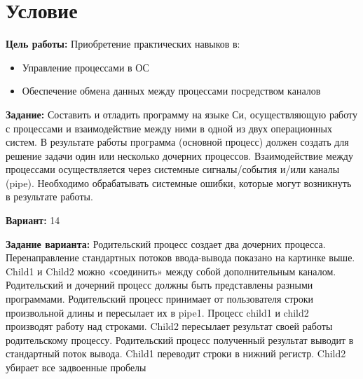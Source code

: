 \section{Условие}
{\bfseries Цель работы:} 
Приобретение практических навыков в:
\begin{itemize}
  \item Управление процессами в ОС
  \item Обеспечение обмена данных между процессами посредством каналов
\end{itemize}

{\bfseries Задание:} Составить и отладить программу на языке Си, осуществляющую работу с процессами и
взаимодействие между ними в одной из двух операционных систем. В результате работы
программа (основной процесс) должен создать для решение задачи один или несколько
дочерних процессов. Взаимодействие между процессами осуществляется через системные
сигналы/события и/или каналы (pipe).
Необходимо обрабатывать системные ошибки, которые могут возникнуть в результате работы.

{\bfseries Вариант:} 14

{\bfseries Задание варианта:}
Родительский процесс создает два дочерних процесса. Перенаправление стандартных потоков
ввода-вывода показано на картинке выше. Child1 и Child2 можно «соединить» между собой
дополнительным каналом. Родительский и дочерний процесс должны быть представлены
разными программами.
Родительский процесс принимает от пользователя строки произвольной длины и пересылает их в
pipe1. Процесс child1 и child2 производят работу над строками. Child2 пересылает результат своей
работы родительскому процессу. Родительский процесс полученный результат выводит в
стандартный поток вывода.
Child1 переводит строки в нижний регистр. Child2 убирает все задвоенные пробелы


